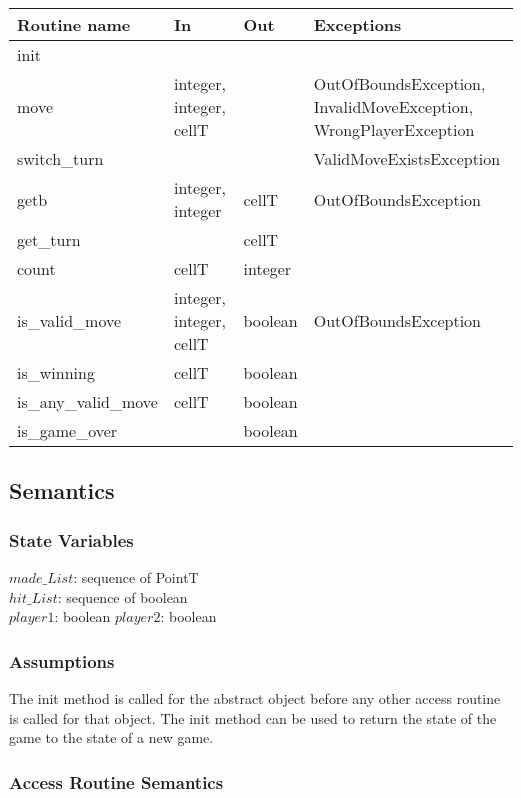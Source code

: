 \documentclass[12pt]{article}
\begin{document}
\begin{tabular}{| l | l | l | p{7cm} |}
\hline
\textbf{Routine name} & \textbf{In} & \textbf{Out} & \textbf{Exceptions}\\
\hline
init & ~ & ~ & ~\\
\hline
move & integer, integer, cellT & ~ & OutOfBoundsException, InvalidMoveException, WrongPlayerException\\
\hline
switch\_turn & ~ & ~ & ValidMoveExistsException\\
\hline
getb & integer, integer & cellT & OutOfBoundsException\\
\hline
get\_turn & ~ & cellT & ~\\
\hline
count & cellT & integer & ~\\
\hline
is\_valid\_move & integer, integer, cellT & boolean & OutOfBoundsException\\
\hline
is\_winning & cellT & boolean & ~\\
\hline
is\_any\_valid\_move & cellT & boolean & ~\\
\hline
is\_game\_over & ~ & boolean & ~\\
\hline

\end{tabular}

\subsection* {Semantics}

\subsubsection* {State Variables}

$made\_List$: sequence of PointT\\
$hit\_List$: sequence of boolean\\
$\mathit{player1}$: boolean
$\mathit{player2}$: boolean

\subsubsection* {Assumptions}

The init method is called for the abstract object before any other access routine is called for that
object.  The init method can be used to return the state of the game to the state of a new game.

\subsubsection* {Access Routine Semantics}
\end{document}
